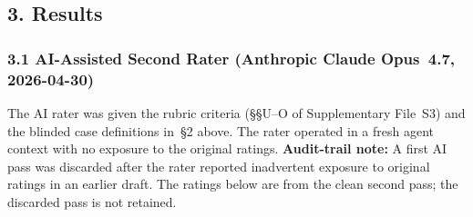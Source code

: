\bigskip


\subsection*{3. Results}

\subsubsection*{3.1 AI-Assisted Second Rater (Anthropic Claude Opus~4.7, 2026-04-30)}

The AI rater was given the rubric criteria (§§U--O of Supplementary File~S3) and the
blinded case definitions in~§2 above. The rater operated in a fresh agent context with no
exposure to the original ratings.
\textbf{Audit-trail note:} A first AI pass was discarded after the rater reported
inadvertent exposure to original ratings in an earlier draft. The ratings below are from
the clean second pass; the discarded pass is not retained.

\medskip
\renewcommand{\arraystretch}{1.3}
\setlength{\tabcolsep}{4pt}

